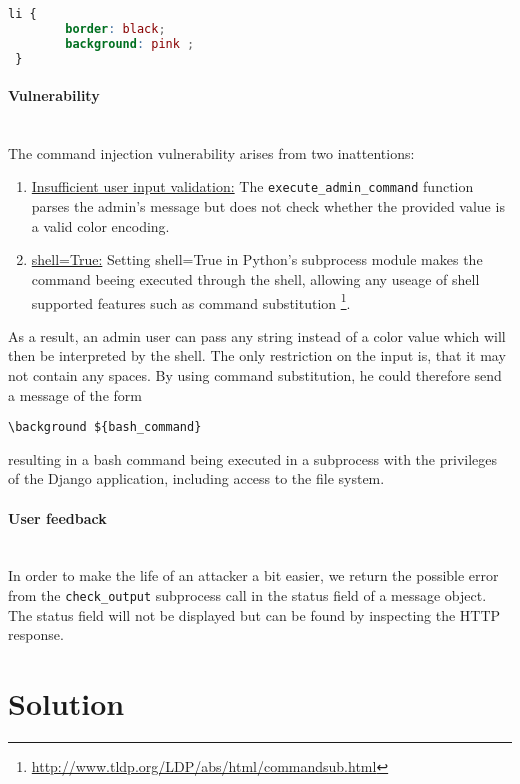 \documentclass[12pt,a4paper]{article}
\newcommand{\code}[1]{\texttt{#1}}
\begin{document}
\begin{lstlisting}[caption={\code{custom.css} file, defining the colors of a chat message},label={lst:css_file}, language=CSS] 
 li {
        border: black;
        background: pink ;
 }
\end{lstlisting}

\paragraph{Vulnerability}
\noindent \\The command injection vulnerability arises from two inattentions:
\begin{enumerate}
\item \underline{Insufficient user input validation:} The \code{execute\_admin\_command} function parses the admin's message but does not check whether the provided value is a valid color encoding.
\item \underline{shell=True:} Setting shell=True in Python's subprocess module makes the command beeing executed through the shell, allowing any useage of shell supported features such as command substitution \footnote{\url{http://www.tldp.org/LDP/abs/html/commandsub.html}}. 
\end{enumerate}
As a result, an admin user can pass any string instead of a color value which will then be interpreted by the shell. The only restriction on the input is, that it may not contain any spaces. By using command substitution, he could therefore send a message of the form
\begin{verbatim}
\background ${bash_command}
\end{verbatim} 
resulting in a bash command being executed in a subprocess with the privileges of the Django application, including access to the file system.

\paragraph{User feedback}
\noindent \\In order to make the life of an attacker a bit easier, we return the possible error from the \code{check\_output} subprocess call in the status field of a message object.  The status field will not be displayed but can be found by inspecting the HTTP response.



\section{Solution}
\end{document}
